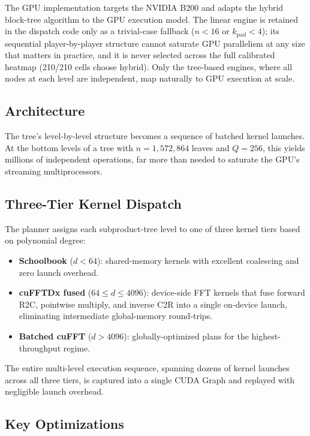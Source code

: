 \documentclass[11pt]{article}
\begin{document}
The GPU implementation targets the NVIDIA B200 and adapts the hybrid
block-tree algorithm to the GPU execution model. The linear engine is
retained in the dispatch code only as a trivial-case fallback ($n < 16$ or
$k_{\text{pad}} < 4$); its sequential player-by-player structure cannot
saturate GPU parallelism at any size that matters in practice, and it is
never selected across the full calibrated heatmap (210/210 cells choose
hybrid). Only the tree-based engines, where all nodes at each level are
independent, map naturally to GPU execution at scale.

\subsection{Architecture}

The tree's level-by-level structure becomes a sequence of batched kernel
launches. At the bottom levels of a tree with $n = 1{,}572{,}864$ leaves
and $Q = 256$, this yields millions of independent operations, far more
than needed to saturate the GPU's streaming multiprocessors.

\subsection{Three-Tier Kernel Dispatch}

The planner assigns each subproduct-tree level to one of three kernel
tiers based on polynomial degree:
\begin{itemize}
  \item \textbf{Schoolbook} ($d < 64$): shared-memory kernels with
    excellent coalescing and zero launch overhead.
  \item \textbf{cuFFTDx fused} ($64 \le d \le 4096$): device-side FFT
    kernels that fuse forward R2C, pointwise multiply, and inverse C2R
    into a single on-device launch, eliminating intermediate global-memory
    round-trips.
  \item \textbf{Batched cuFFT} ($d > 4096$): globally-optimized plans
    for the highest-throughput regime.
\end{itemize}

The entire multi-level execution sequence, spanning dozens of kernel launches
across all three tiers, is captured into a single CUDA Graph and replayed
with negligible launch overhead.

\subsection{Key Optimizations}
\end{document}
